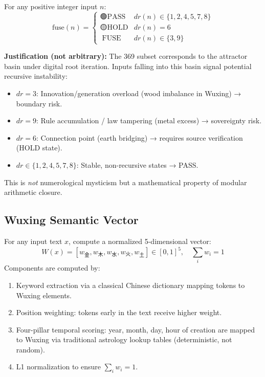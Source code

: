 \documentclass[twocolumn]{article}
\begin{document}
\begin{definition}
For any positive integer input $n$:
\[
\text{fuse}(n) = \begin{cases}
🟢 \text{PASS} & dr(n) \in \{1,2,4,5,7,8\} \\
🟡 \text{HOLD} & dr(n) = 6 \\
🔴 \text{FUSE} & dr(n) \in \{3,9\}
\end{cases}
\]
\end{definition}

\textbf{Justification (not arbitrary):} The 369 subset corresponds to the attractor basin under digital root iteration. Inputs falling into this basin signal potential recursive instability:

\begin{itemize}
  \item $dr = 3$: Innovation/generation overload (wood imbalance in Wuxing) → boundary risk.
  \item $dr = 9$: Rule accumulation / law tampering (metal excess) → sovereignty risk.
  \item $dr = 6$: Connection point (earth bridging) → requires source verification (HOLD state).
  \item $dr \in \{1,2,4,5,7,8\}$: Stable, non-recursive states → PASS.
\end{itemize}

This is \emph{not} numerological mysticism but a mathematical property of modular arithmetic closure.

\subsection{Wuxing Semantic Vector}

\begin{definition}
For any input text $x$, compute a normalized 5-dimensional vector:
\[
W(x) = [w_{\text{金}}, w_{\text{木}}, w_{\text{水}}, w_{\text{火}}, w_{\text{土}}] \in [0,1]^5, \quad \sum_i w_i = 1
\]
Components are computed by:
\begin{enumerate}
  \item Keyword extraction via a classical Chinese dictionary mapping tokens to Wuxing elements.
  \item Position weighting: tokens early in the text receive higher weight.
  \item Four-pillar temporal scoring: year, month, day, hour of creation are mapped to Wuxing via traditional astrology lookup tables (deterministic, not random).
  \item L1 normalization to ensure $\sum_i w_i = 1$.
\end{enumerate}
\end{definition}
\end{document}
